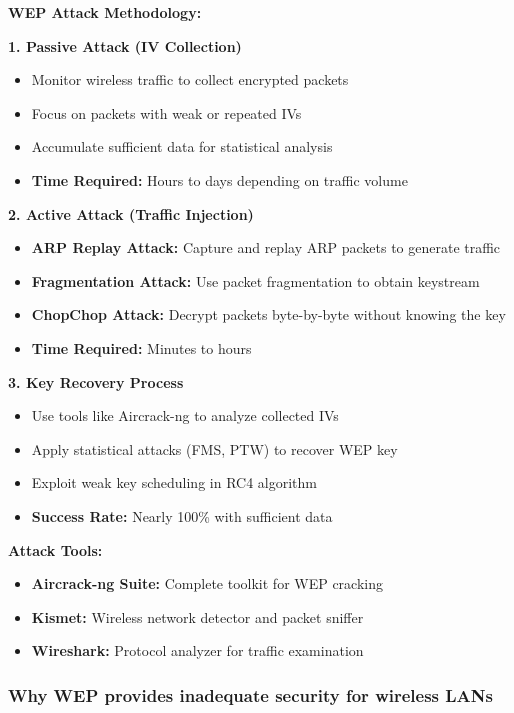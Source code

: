 \documentclass[12pt,a4paper]{article}
\begin{document}
\textbf{WEP Attack Methodology:}

\textbf{1. Passive Attack (IV Collection)}
\begin{itemize}
    \item Monitor wireless traffic to collect encrypted packets
    \item Focus on packets with weak or repeated IVs
    \item Accumulate sufficient data for statistical analysis
    \item \textbf{Time Required:} Hours to days depending on traffic volume
\end{itemize}

\textbf{2. Active Attack (Traffic Injection)}
\begin{itemize}
    \item \textbf{ARP Replay Attack:} Capture and replay ARP packets to generate traffic
    \item \textbf{Fragmentation Attack:} Use packet fragmentation to obtain keystream
    \item \textbf{ChopChop Attack:} Decrypt packets byte-by-byte without knowing the key
    \item \textbf{Time Required:} Minutes to hours
\end{itemize}

\textbf{3. Key Recovery Process}
\begin{itemize}
    \item Use tools like Aircrack-ng to analyze collected IVs
    \item Apply statistical attacks (FMS, PTW) to recover WEP key
    \item Exploit weak key scheduling in RC4 algorithm
    \item \textbf{Success Rate:} Nearly 100\% with sufficient data
\end{itemize}

\textbf{Attack Tools:}
\begin{itemize}
    \item \textbf{Aircrack-ng Suite:} Complete toolkit for WEP cracking
    \item \textbf{Kismet:} Wireless network detector and packet sniffer
    \item \textbf{Wireshark:} Protocol analyzer for traffic examination
\end{itemize}

\subsubsection{Why WEP provides inadequate security for wireless LANs}
\end{document}
